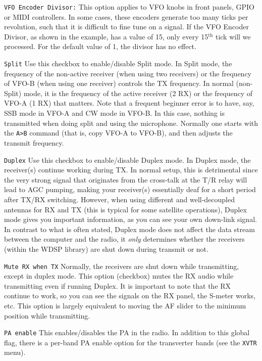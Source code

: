 \documentclass[12pt]{book}
\def\rett#1{\texttt{\color{red}#1}}
\def\bltt#1{\texttt{\color{blue}#1}}
\begin{document}
\rett{VFO Encoder Divisor:} This option applies to VFO knobs in front panels, GPIO
or MIDI controllers. In some cases, these encoders generate too many ticks per revolution,
such that it is difficult to fine tune on a signal.
If the VFO Encoder Divisor, as shown in the example, has a value of
15, only every 15$^\textrm{th}$ tick will we processed. For the default value of 1,
the divisor has no effect.

\rett{Split} Use this checkbox to enable/disable Split mode. In Split mode, the frequency of
the non-active receiver (when using two receivers) or the frequency of VFO-B (when using one
receiver) controls the TX frequency. In normal (non-Split) mode, it is the frequency of
the active receiver (2 RX) or the frequency of VFO-A (1 RX) that matters.
Note that a frequent beginner error is to have, say,
SSB mode in VFO-A and CW mode in VFO-B. In this case, nothing is
transmitted when doing split and using the microphone. Normally one
starts with the \bltt{A>B} command (that is, copy VFO-A to VFO-B), and
then adjusts the transmit frequency.

\rett{Duplex} Use this checkbox to enable/disable Duplex mode. In Duplex mode, the receiver(s)
continue working during TX. In normal setup, this is detrimental since the very strong
signal that originates from the cross-talk at the T/R relay will lead to AGC pumping,
making your receiver(s) essentially deaf for a short period after TX/RX switching.
However, when using different and well-decoupled antennas for RX and TX (this is typical
for some satellite operations), Duplex mode gives you important information, as you can
see your own down-link signal. In contrast to what is often stated, Duplex mode does not
affect the data stream between the computer and the radio, it \textit{only} determines
whether the receivers (within the WDSP library) are shut down during transmit or not.

\rett{Mute RX when TX} Normally, the receivers are shut down while transmitting, except
in duplex mode. This option (checkbox) mutes the RX audio while transmitting even if running
Duplex. It is important
to note that the RX continue to work, so you can see the signals on the RX panel, the
S-meter works, etc. This option is largely equivalent to moving the AF slider to the
minimum position while transmitting.

\rett{PA enable} This enables/disables the PA in the radio. In addition to this global
flag, there is a per-band PA enable option for the transverter bands (see the \bltt{XVTR}
menu).
\end{document}
